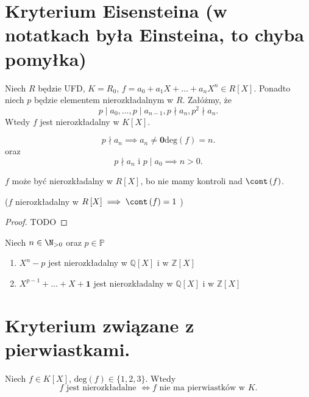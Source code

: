 \section{Kryterium Eisensteina (w notatkach była Einsteina, to  chyba pomyłka)}
Niech $R$ będzie UFD, $K = R_0$, $f = a_0 + a_1X + \ldots + a_{n}X^{n}\in R\left[ X \right] $. Ponadto niech $p$ będzie elementem nierozkładalnym w $R$. Załóżmy, że 
\[p\mid a_0,\ldots, p\mid a_{n-1}, p\nmid a_{n} , p^2\nmid a_{n} .\]
Wtedy $f$ jest nierozkładalny w  $K\left[ X \right] $.

\begin{remark}
	\[
	p\nmid a_{n} \implies a_{n} \neq \mathbf{0} \text{deg}(f) = n
	.\] 
	oraz
	\[
	p\nmid a_{n} \text{ i } p\mid a_0 \implies n>0
	.\] 
\end{remark} 
\begin{remark}
	$f$ może być nierozkładalny w $R\left[ X \right] $, bo nie mamy kontroli nad $\cont \left( f \right) $.

	($f$ nierozkładalny w $R\left[ X \right] \implies \cont \left( f \right) = 1$ )
\end{remark} 
\begin{proof}
	TODO
\end{proof} 
\begin{eg}
	Niech $n \in \N_{>0}$ oraz $p\in \mathbb{P}$
	\begin{enumerate}[label=\arabic*)]
		\item $X^{n}-p$ jest nierozkładalny w $\mathbb{Q} \left[ X \right] $ i w $\mathbb{Z} \left[ X \right] $
		\item $X^{p-1} + \ldots + X + \mathbf{1}$ jest nierozkładalny w $\mathbb{Q} \left[ X \right] $ i w $\mathbb{Z} \left[ X \right] $
	\end{enumerate}
\end{eg} 
\section{Kryterium związane z pierwiastkami.}
Niech $f\in K\left[ X \right] $, $\text{deg}\left( f \right) \in \{1,2,3\} $. Wtedy 
\[
f \text{ jest nierozkładalne } \iff f  \text{ nie ma pierwiastków w } K
.\] 

